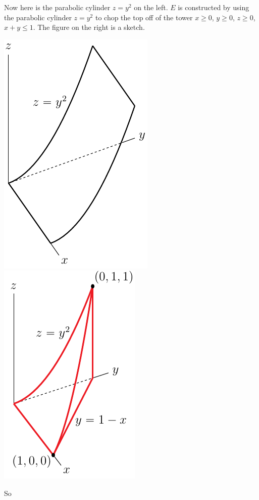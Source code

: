 \begin{solution}
\begin{center}
\end{center}
Now here is the parabolic cylinder $z=y^2$ on the left.
$E$ is constructed by using the parabolic cylinder $z=y^2$ to chop the top
off of the tower $x\ge 0$, $y\ge 0$, $z\ge 0$,  $x+y\le 1$. The figure 
on the right is a sketch.
\begin{center}
     \includegraphics{fig/OE12A_8b.pdf}\qquad
     \includegraphics{fig/OE12A_8c.pdf}
\end{center}
So
\begin{equation*}

\end{equation*}
\end{solution}
